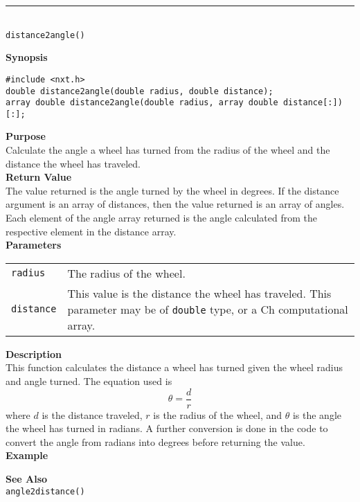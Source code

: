 \noindent
\vspace{5pt}
\rule{4.5in}{0.015in}\\
\noindent
{\LARGE \texttt{distance2angle()}}\\
{}

\noindent
{\bf Synopsis}
\vspace{-8pt}
\begin{verbatim}
#include <nxt.h>
double distance2angle(double radius, double distance);
array double distance2angle(double radius, array double distance[:])[:];
\end{verbatim}

\noindent
{\bf Purpose}\\
Calculate the angle a wheel has turned from the radius of the wheel and
the distance the wheel has traveled.\\

\noindent
{\bf Return Value}\\
The value returned is the angle turned by the wheel in degrees. If the distance argument is an
array of distances, then the value returned is an array of angles. Each element
of the angle array returned is the angle calculated from the respective
element in the distance array.\\

\noindent
{\bf Parameters}
\vspace{-0.1in}
\begin{description}
\item               
\begin{tabular}{p{15 mm}p{145 mm}}
\texttt{radius} & The radius of the wheel. \\
\texttt{distance} & This value is the distance the wheel has traveled. This parameter may be of \texttt{double} type, or a Ch computational array. \\
\end{tabular}
\end{description}

\noindent
{\bf Description}\\
This function calculates the distance a wheel has turned given the wheel 
radius and angle turned. The equation used is
\begin{equation*}
\theta = \frac{d}{r}
\end{equation*}
where $d$ is the distance traveled, $r$ is the radius of the wheel, and $\theta$ is
the angle the wheel has turned in radians. A further conversion is done in the code to
convert the angle from radians into degrees before returning the value.
\\

\noindent
{\bf Example}\\
\noindent

\noindent
{\bf See Also}\\
\texttt{angle2distance()}

